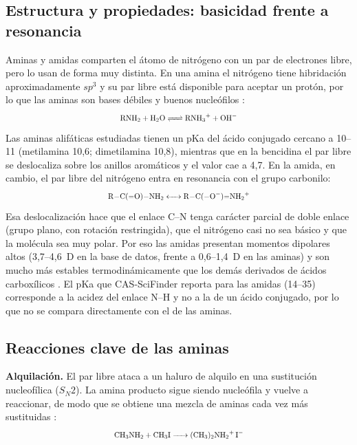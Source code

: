%

\providecommand{\reac}[1]{\scalebox{0.8}{$\ce{#1}$}}

\subsection{Estructura y propiedades: basicidad frente a resonancia}
\label{sec:estructura}
Aminas y amidas comparten el átomo de nitrógeno con un par de electrones
libre, pero lo usan de forma muy distinta. En una amina el nitrógeno tiene
hibridación aproximadamente $sp^3$ y su par libre está disponible para
aceptar un protón, por lo que las aminas son bases débiles y buenos
nucleófilos \cite{wade2017}:
\begin{equation}
	\reac{RNH2 + H2O <=> RNH3+ + OH-}
\end{equation}
Las aminas alifáticas estudiadas tienen un pKa del ácido conjugado cercano
a 10--11 (metilamina 10,6; dimetilamina 10,8), mientras que en la bencidina
el par libre se deslocaliza sobre los anillos aromáticos y el valor cae a
4,7. En la amida, en cambio, el par libre del nitrógeno entra en resonancia
con el grupo carbonilo:
\begin{equation}
	\reac{R-C(=O)-NH2 <-> R-C(-O^-)=NH2+}
\end{equation}
Esa deslocalización hace que el enlace C--N tenga carácter parcial de doble
enlace (grupo plano, con rotación restringida), que el nitrógeno casi no sea
básico y que la molécula sea muy polar. Por eso las amidas presentan
momentos dipolares altos (3,7--4,6~D en la base de datos, frente a
0,6--1,4~D en las aminas) y son mucho más estables
termodinámicamente que los demás derivados de ácidos carboxílicos
\cite{clayden2012}. El pKa que CAS-SciFinder reporta para las amidas
(14--35) corresponde a la acidez del enlace N--H y no a la de un ácido
conjugado, por lo que no se compara directamente con el de las aminas.

\subsection{Reacciones clave de las aminas}
\label{sec:reac-aminas}
\textbf{Alquilación.} El par libre ataca a un haluro de alquilo en una
sustitución nucleofílica ($S_N2$). La amina producto sigue siendo
nucleófila y vuelve a reaccionar, de modo que se obtiene una mezcla de
aminas cada vez más sustituidas \cite{mcmurry2016}:
\begin{equation}
	\reac{CH3NH2 + CH3I -> (CH3)2NH2+ I-}
\end{equation}

